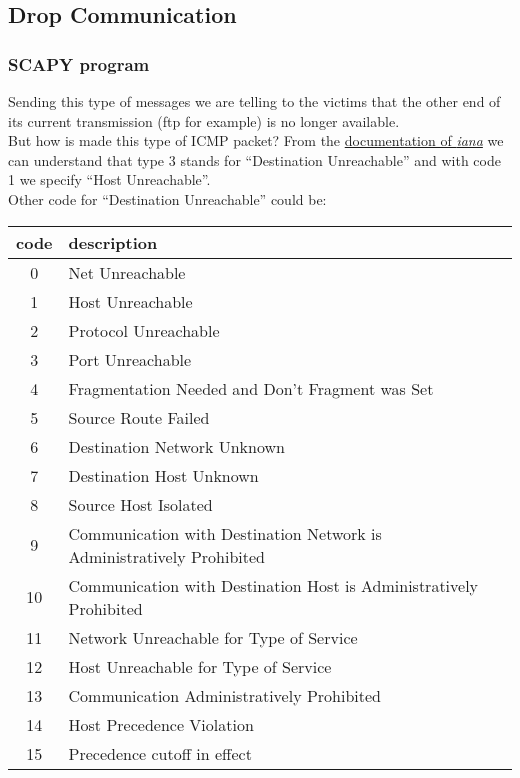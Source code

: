 \subsection{Drop Communication}
\subsubsection{SCAPY program}

Sending this type of messages we are telling to the victims that the other end of its current transmission (ftp for example) is no longer available.\\
But how is made this type of ICMP packet? From the \href{https://www.iana.org/assignments/icmp-parameters/icmp-parameters.xhtml}{documentation of \textit{iana}} we can understand that type 3 stands for “Destination Unreachable” and with code 1 we specify “Host Unreachable”.\\
Other code for “Destination Unreachable” could be:\par
\medskip
\begin{tabular}{|c|l|}
  \hline
  \textbf{code} & \textbf{description} \\
  \hline
  0 & Net Unreachable \\
  1 & Host Unreachable \\
  2 & Protocol Unreachable \\
  3 & Port Unreachable \\
  4 & Fragmentation Needed and Don't Fragment was Set \\
  5 & Source Route Failed \\
  6 & Destination Network Unknown \\
  7 & Destination Host Unknown \\
  8 & Source Host Isolated \\
  9 & Communication with Destination Network is Administratively Prohibited \\
  10 & Communication with Destination Host is Administratively Prohibited \\
  11 & Network Unreachable for Type of Service \\
  12 & Host Unreachable for Type of Service \\
  13 & Communication Administratively Prohibited \\
  14 & Host Precedence Violation \\
  15 & Precedence cutoff in effect \\
  \hline
\end{tabular}


